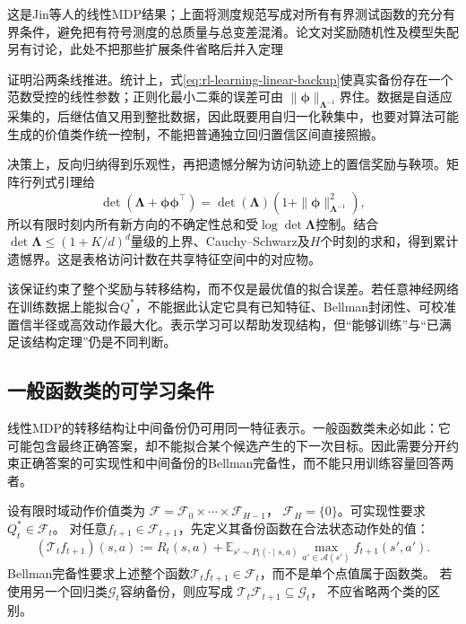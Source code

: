 这是Jin等人的线性MDP结果；上面将测度规范写成对所有有界测试函数的充分有界条件，避免把有符号测度的总质量与总变差混淆。论文对奖励随机性及模型失配另有讨论，此处不把那些扩展条件省略后并入定理

证明沿两条线推进。统计上，式\eqref{eq:rl-learning-linear-backup}使真实备份存在一个范数受控的线性参数；正则化最小二乘的误差可由
$\|\bm\phi\|_{\bm\Lambda^{-1}}$界住。数据是自适应采集的，后继估值又用到整批数据，因此既要用自归一化鞅集中，也要对算法可能生成的价值类作统一控制，不能把普通独立回归置信区间直接照搬。

决策上，反向归纳得到乐观性，再把遗憾分解为访问轨迹上的置信奖励与鞅项。矩阵行列式引理给
\[
 \det(\bm\Lambda+\bm\phi\bm\phi^\top)
    =\det(\bm\Lambda)(1+\|\bm\phi\|_{\bm\Lambda^{-1}}^2),
\]
所以有限时刻内所有新方向的不确定性总和受$\log\det\bm\Lambda$控制。结合
$\det\bm\Lambda\leq(1+K/d)^d$量级的上界、Cauchy--Schwarz及$H$个时刻的求和，得到累计遗憾界。这是表格访问计数在共享特征空间中的对应物。

该保证约束了整个奖励与转移结构，而不仅是最优值的拟合误差。若任意神经网络在训练数据上能拟合$Q^*$，不能据此认定它具有已知特征、Bellman封闭性、可校准置信半径或高效动作最大化。表示学习可以帮助发现结构，但“能够训练”与“已满足该结构定理”仍是不同判断。

\subsection{一般函数类的可学习条件}
\label{sec:rl-learning-function-classes}

线性MDP的转移结构让中间备份仍可用同一特征表示。一般函数类未必如此：它可能包含最终正确答案，却不能拟合某个候选产生的下一次目标。因此需要分开约束正确答案的可实现性和中间备份的Bellman完备性，而不能只用训练容量回答两者。

\begin{definition}[可实现性与Bellman完备性]
  \label{def:rl-learning-realizability}
  设有限时域动作价值类为
  $\mathcal F=\mathcal F_0\times\cdots\times\mathcal F_{H-1}$，
  $\mathcal F_H=\{0\}$。可实现性要求$Q_t^*\in\mathcal F_t$。
  对任意$f_{t+1}\in\mathcal F_{t+1}$，先定义其备份函数在合法状态动作处的值：
  \[
    (\mathcal T_t f_{t+1})(s,a)
       :=R_t(s,a)+\mathbb E_{s'\sim P_t(\cdot\mid s,a)}
                   \max_{a'\in\mathcal A(s')}f_{t+1}(s',a').
  \]
  Bellman完备性要求上述整个函数$\mathcal T_t f_{t+1}\in\mathcal F_t$，而不是单个点值属于函数类。
  若使用另一个回归类$\mathcal G_t$容纳备份，则应写成
  $\mathcal T_t\mathcal F_{t+1}\subseteq\mathcal G_t$，
  不应省略两个类的区别。
\end{definition}

